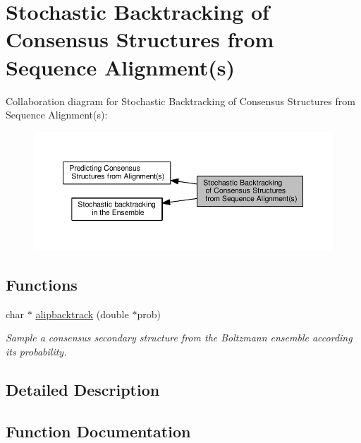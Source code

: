 \hypertarget{group__consensus__stochbt}{}\section{Stochastic Backtracking of Consensus Structures from Sequence Alignment(s)}
\label{group__consensus__stochbt}
Collaboration diagram for Stochastic Backtracking of Consensus Structures from Sequence Alignment(s)\+:
\nopagebreak
\begin{figure}[H]
\begin{center}
\leavevmode
\includegraphics[width=350pt]{group__consensus__stochbt}
\end{center}
\end{figure}
\subsection*{Functions}
\begin{DoxyCompactItemize}
\item 
char $\ast$ \hyperlink{group__consensus__stochbt_ga0df40248788f0fb17ebdc59d74116d1c}{alipbacktrack} (double $\ast$prob)
\begin{DoxyCompactList}\small\item\em Sample a consensus secondary structure from the Boltzmann ensemble according its probability. \end{DoxyCompactList}\end{DoxyCompactItemize}


\subsection{Detailed Description}


\subsection{Function Documentation}
\hypertarget{group__consensus__stochbt_ga0df40248788f0fb17ebdc59d74116d1c}{}
